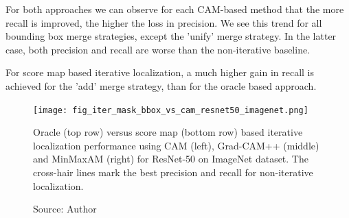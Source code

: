 For both approaches we can observe for each CAM-based method that the more recall is improved, the higher the loss in precision. We see this trend for all bounding box merge strategies, except the 'unify' merge strategy. In the latter case, both precision and recall are worse than the non-iterative baseline.

For score map based iterative localization, a much higher gain in recall is achieved for the 'add' merge strategy, than for the oracle based approach. 


\begin{figure}[h]
    \begin{center}       
    \texttt{[image: fig\_iter\_mask\_bbox\_vs\_cam\_resnet50\_imagenet.png]}
    \caption[Oracle versus score map based iterative localization performance for ResNet-50 on ImageNet dataset]{Oracle (top row) versus score map (bottom row) based iterative localization performance using CAM (left), Grad-CAM++ (middle) and MinMaxAM (right) for ResNet-50 on ImageNet dataset. The cross-hair lines mark the best precision and recall for non-iterative localization.}
    \caption*{Source: Author}
    \label{fig:prec_iter_mask_bbox_vs_camresnet50_imagenet}
    \end{center}
\end{figure}